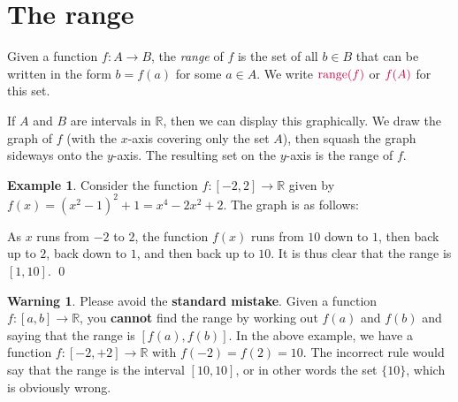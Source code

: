 \documentclass[a4paper]{book}
\newcommand{\RED}[1]{{\color{red}#1}}
\newcommand{\PURPLE}[1]{{\color{purple}#1}}
\newcommand{\R}         {{\mathbb{R}}}
\newcommand{\xra}       {\xrightarrow}
\newcommand{\range}     {\operatorname{range}}
\renewcommand{\:}{\colon}
\newcommand{\DEFN}[1]{\PURPLE{\emph{#1}}}
\theoremstyle{definition}
\newtheorem{warning}[theorem]{Warning}
\newtheorem{example}[theorem]{Example}
\begin{document}
\section{The range}
\label{sec-range}

Given a function $f\:A\xra{}B$, the \DEFN{range} of $f$ is the set of
all $b\in B$ that can be written in the form $b=f(a)$ for some 
$a\in A$.  We write $\PURPLE{\range(f)}$ or $\PURPLE{f(A)}$ for this
set. 

If $A$ and $B$ are intervals in $\R$, then we can display this
graphically.  We draw the graph of $f$ (with the $x$-axis covering
only the set $A$), then squash the graph sideways onto the $y$-axis.
The resulting set on the $y$-axis is the range of $f$.
\begin{example}
 Consider the function $f\:[-2,2]\xra{}\R$ given by
 $f(x)=(x^2-1)^2+1=x^4-2x^2+2$.  The graph is as follows:
 \begin{center}
 \end{center}
 As $x$ runs from $-2$ to $2$, the function $f(x)$ runs from $10$ down
 to $1$, then back up to $2$, back down to $1$, and then back up to
 $10$.  It is thus clear that the range is $[1,10]$. \qed
\end{example}
\begin{warning}
 Please avoid the \RED{\textbf{standard mistake}}.  Given a function
 $f\:[a,b]\xra{}\R$, you \RED{\textbf{cannot}} find the range by working
 out $f(a)$ and $f(b)$ and saying that the range is $[f(a),f(b)]$.  In
 the above example, we have a function $f\:[-2,+2]\xra{}\R$ with
 $f(-2)=f(2)=10$.  The incorrect rule would say that the range is the
 interval $[10,10]$, or in other words the set $\{10\}$, which is
 obviously wrong.
\end{warning}
\end{document}
